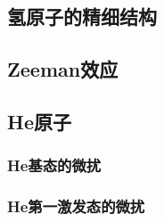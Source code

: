 \subsection{氢原子的精细结构}

\subsection{Zeeman效应}

\subsection{He原子}
\subsubsection{He基态的微扰}

\subsubsection{He第一激发态的微扰}